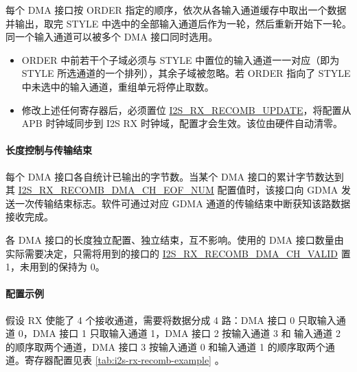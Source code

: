 \documentclass[main\_\_CN.tex]{subfiles}
\begin{document}
每个 DMA 接口按 ORDER 指定的顺序，依次从各输入通道缓存中取出一个数据并输出，取完 STYLE 中选中的全部输入通道后作为一轮，然后重新开始下一轮。同一个输入通道可以被多个 DMA 接口同时选用。

\vspace{-1em}
\begin{tiplisting}
\vspace{-2em}
\begin{itemize}
    \item ORDER 中前若干个子域必须与 STYLE 中置位的输入通道一一对应（即为 STYLE 所选通道的一个排列），其余子域被忽略。若 ORDER 指向了 STYLE 中未选中的输入通道，重组单元将停止取数。
    \item 修改上述任何寄存器后，必须置位 \hyperref[fielddesc:I2SRXRECOMBUPDATE]{I2S\_RX\_RECOMB\_UPDATE}，将配置从 APB 时钟域同步到 I2S RX 时钟域，配置才会生效。该位由硬件自动清零。
\end{itemize}
\end{tiplisting}

\paragraph{长度控制与传输结束}

每个 DMA 接口各自统计已输出的字节数。当某个 DMA 接口的累计字节数达到其 \hyperref[fielddesc:I2SRXRECOMBDMACH0EOFNUM]{I2S\_RX\_RECOMB\_DMA\_CH\_EOF\_NUM} 配置值时，该接口向 GDMA 发送一次传输结束标志。软件可通过对应 GDMA 通道的传输结束中断获知该路数据接收完成。

各 DMA 接口的长度独立配置、独立结束，互不影响。使用的 DMA 接口数量由实际需要决定，只需将用到的接口的 \hyperref[fielddesc:I2SRXRECOMBDMACH0VALID]{I2S\_RX\_RECOMB\_DMA\_CH\_VALID} 置 1，未用到的保持为 0。

\paragraph{配置示例}

假设 RX 使能了 4 个接收通道，需要将数据分成 4 路：DMA 接口 0 只取输入通道 0，DMA 接口 1 只取输入通道 1，DMA 接口 2 按输入通道 3 和 输入通道 2 的顺序取两个通道，DMA 接口 3 按输入通道 0 和输入通道 1 的顺序取两个通道。寄存器配置见表 \ref{tab:i2s-rx-recomb-example} \textit{}。
\end{document}

